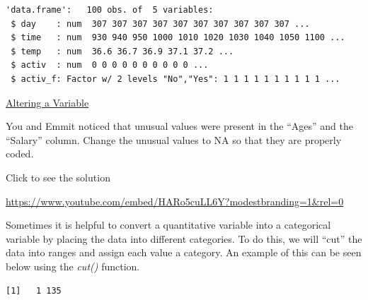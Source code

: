 \documentclass[
  letterpaper,
  DIV=11,
  numbers=noendperiod]{scrreprt}
\newenvironment{Shaded}{\begin{snugshade}}{\end{snugshade}}
\newcommand{\AttributeTok}[1]{\textcolor[rgb]{0.40,0.45,0.13}{#1}}
\newcommand{\ConstantTok}[1]{\textcolor[rgb]{0.56,0.35,0.01}{#1}}
\newcommand{\FunctionTok}[1]{\textcolor[rgb]{0.28,0.35,0.67}{#1}}
\newcommand{\NormalTok}[1]{\textcolor[rgb]{0.00,0.23,0.31}{#1}}
\newcommand{\SpecialCharTok}[1]{\textcolor[rgb]{0.37,0.37,0.37}{#1}}
\begin{document}
\begin{verbatim}
'data.frame':   100 obs. of  5 variables:
 $ day    : num  307 307 307 307 307 307 307 307 307 307 ...
 $ time   : num  930 940 950 1000 1010 1020 1030 1040 1050 1100 ...
 $ temp   : num  36.6 36.7 36.9 37.1 37.2 ...
 $ activ  : num  0 0 0 0 0 0 0 0 0 0 ...
 $ activ_f: Factor w/ 2 levels "No","Yes": 1 1 1 1 1 1 1 1 1 1 ...
\end{verbatim}

\begin{watch}{}{}
    \href{https://youtu.be/fAcw4RpMgzU}{Altering a Variable}
\end{watch}

\begin{tcolorbox}[enhanced jigsaw, leftrule=.75mm, arc=.35mm, coltitle=black, rightrule=.15mm, bottomrule=.15mm, toprule=.15mm, left=2mm, colbacktitle=quarto-callout-tip-color!10!white, title=\textcolor{quarto-callout-tip-color}{\faLightbulb}\hspace{0.5em}{Try it Out}, toptitle=1mm, breakable, colframe=quarto-callout-tip-color-frame, bottomtitle=1mm, titlerule=0mm, colback=white, opacityback=0, opacitybacktitle=0.6]

You and Emmit noticed that unusual values were present in the ``Ages''
and the ``Salary'' column. Change the unusual values to NA so that they
are properly coded.

Click to see the solution

\url{https://www.youtube.com/embed/HARo5cuLL6Y?modestbranding=1&rel=0}

\end{tcolorbox}

Sometimes it is helpful to convert a quantitative variable into a
categorical variable by placing the data into different categories. To
do this, we will ``cut'' the data into ranges and assign each value a
category. An example of this can be seen below using the \emph{cut()}
function.

\begin{Shaded}
\end{Shaded}

\begin{verbatim}
[1]   1 135
\end{verbatim}
\end{document}
